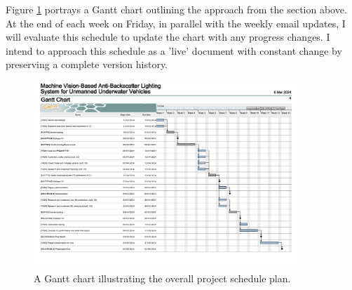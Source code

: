 Figure \ref{fig:gantt_chart} portrays a Gantt chart outlining the approach from the section above. At the end of each week on Friday, in parallel with the weekly email updates, I will evaluate this schedule to update the chart with any progress changes. I intend to approach this schedule as a 'live' document with constant change by preserving a complete version history.

\begin{figure}[h]
    \centering
    \includegraphics[width=0.89\textwidth]{assets/gantt_chart.png}
    \caption{A Gantt chart illustrating the overall project schedule plan.}
    \label{fig:gantt_chart}
\end{figure}
